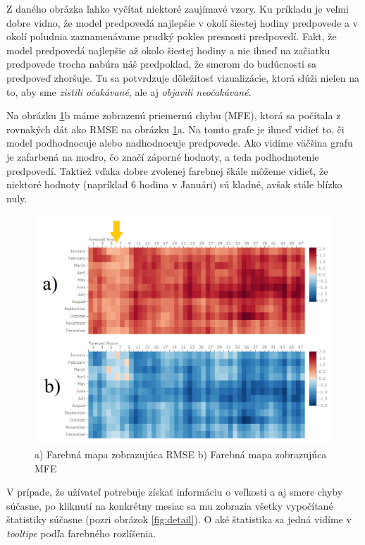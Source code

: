 Z daného obrázka ľahko vyčítať niektoré zaujímavé vzory. Ku príkladu je veľmi dobre vidno, že model predpovedá najlepšie v okolí šiestej hodiny predpovede a v okolí poludnia zaznamenávame prudký pokles presnosti predpovedí. Fakt, že model predpovedá najlepšie až okolo šiestej hodiny a nie ihneď na začiatku predpovede trocha nabúra náš predpoklad, že smerom do budúcnosti sa predpoveď zhoršuje. Tu sa potvrdzuje dôležitosť vizualizácie, ktorá slúži nielen na to, aby sme \textit{zistili očakávané}, ale aj \textit{objavili neočakávané}.

Na obrázku \ref{fig:overview}b máme zobrazenú priemernú chybu (MFE), ktorá sa počítala z rovnakých dát ako RMSE na obrázku \ref{fig:overview}a. Na tomto grafe je ihneď vidieť to, či model podhodnocuje alebo nadhodnocuje predpovede. Ako vidíme väčšina grafu je zafarbená na modro, čo značí záporné hodnoty, a teda podhodnotenie predpovedí. Taktiež vďaka dobre zvolenej farebnej škále môžeme vidieť, že niektoré hodnoty (napríklad 6 hodina v Januári) sú kladné, avšak stále blízko nuly.

\begin{figure}
	\centering
	\includegraphics[width = 5in]{overview}
	\caption{a) Farebná mapa zobrazujúca RMSE b) Farebná mapa zobrazujúca MFE}
	\label{fig:overview} 
\end{figure}

V prípade, že užívateľ potrebuje získať informáciu o veľkosti a aj smere chyby súčasne, po kliknutí na konkrétny mesiac sa mu zobrazia všetky vypočítané štatistiky súčasne (pozri obrázok \ref{fig:detail}). O aké štatistika sa jedná vidíme v \textit{tooltipe} podľa farebného rozlíšenia.

